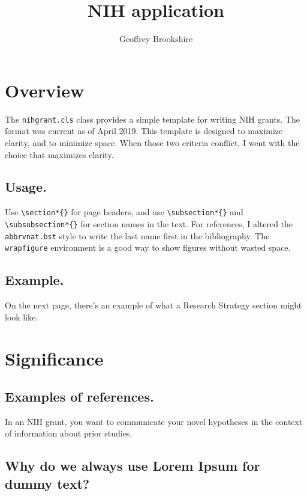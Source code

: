 \documentclass{nihgrant}
\title{NIH application}
\author{Geoffrey Brookshire}
\date{}
\begin{document}
\section*{Overview}

The \verb|nihgrant.cls| class provides a simple template for writing NIH grants. The format was current as of April 2019. This template is designed to maximize clarity, and to minimize space. When those two criteria conflict, I went with the choice that maximizes clarity.

\subsection*{Usage.}
Use \verb|\section*{}| for page headers, and use \verb|\subsection*{}| and \verb|\subsubsection*{}| for section names in the text. For references, I altered the \verb|abbrvnat.bst| style to write the last name first in the bibliography. The \verb|wrapfigure| environment is a good way to show figures without wasted space.

\subsection*{Example.}
On the next page, there's an example of what a Research Strategy section might look like.

\pagebreak

\section*{Significance}

\subsection*{Examples of references.} In an NIH grant, you want to communicate your novel hypotheses \cite{kuhn1962} in the context of information \cite{shannon1948} about prior studies.

\subsection*{Why do we always use Lorem Ipsum for dummy text?}
\lipsum[1-1]
\end{document}
